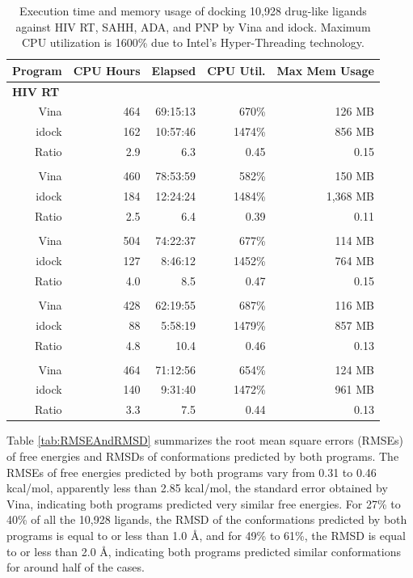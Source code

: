\documentclass[10pt, conference, compsocconf]{IEEEtran}
\begin{document}
\begin{table}
\centering
\begin{tabular*}
{\linewidth}
{@{\extracolsep{\fill}}rrrrr}
\toprule
Program & CPU Hours & Elapsed & CPU Util. & Max Mem Usage\\
\midrule
\multicolumn{5}{l}{\textbf{HIV RT}}\\
Vina  & 464 & 69:15:13 &  670\% & 126 MB\\
idock & 162 & 10:57:46 & 1474\% & 856 MB\\
Ratio & 2.9 &      6.3 & 0.45   & 0.15\\
\noalign{\smallskip\smallskip}
\multicolumn{5}{l}{\textbf{SAHH}}\\
Vina  & 460 & 78:53:59 &  582\% &   150 MB\\
idock & 184 & 12:24:24 & 1484\% & 1,368 MB\\
Ratio & 2.5 &      6.4 &  0.39  & 0.11\\
\noalign{\smallskip\smallskip}
\multicolumn{5}{l}{\textbf{ADA}}\\
Vina  & 504 & 74:22:37 &  677\% & 114 MB\\
idock & 127 &  8:46:12 & 1452\% & 764 MB\\
Ratio & 4.0 &      8.5 &  0.47  & 0.15\\
\noalign{\smallskip\smallskip}
\multicolumn{5}{l}{\textbf{PNP}}\\
Vina  & 428 & 62:19:55 &  687\% & 116 MB\\
idock &  88 &  5:58:19 & 1479\% & 857 MB\\
Ratio & 4.8 &     10.4 &  0.46  & 0.13\\
\noalign{\smallskip\smallskip}
\multicolumn{5}{l}{\textbf{Average}}\\
Vina  & 464 & 71:12:56 &  654\% & 124 MB\\
idock & 140 &  9:31:40 & 1472\% & 961 MB\\
Ratio & 3.3 &      7.5 & 0.44   & 0.13\\
\bottomrule
\end{tabular*}
\caption{Execution time and memory usage of docking 10,928 drug-like ligands against HIV RT, SAHH, ADA, and PNP by Vina and idock. Maximum CPU utilization is 1600\% due to Intel's Hyper-Threading technology.}
\label{tab:ExecutionTimeAndMemoryUsage}
\end{table}

Table \ref{tab:RMSEAndRMSD} summarizes the root mean square errors (RMSEs) of free energies and RMSDs of conformations predicted by both programs. The RMSEs of free energies predicted by both programs vary from 0.31 to 0.46 kcal/mol, apparently less than 2.85 kcal/mol, the standard error obtained by Vina, indicating both programs predicted very similar free energies. For 27\% to 40\% of all the 10,928 ligands, the RMSD of the conformations predicted by both programs is equal to or less than 1.0 \AA, and for 49\% to 61\%, the RMSD is equal to or less than 2.0 \AA, indicating both programs predicted similar conformations for around half of the cases.
\end{document}
